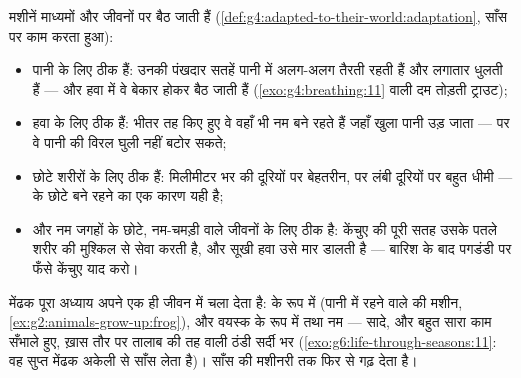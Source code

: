 \begin{proposition}[कौन-सी मशीन कहाँ, और क्यों]\label{prop:g7:how-animals-breathe:fits}
मशीनें माध्यमों और जीवनों पर बैठ जाती हैं
(\cref{def:g4:adapted-to-their-world:adaptation}, साँस पर काम करता
हुआ):
\begin{itemize}
  \item {} पानी के लिए ठीक हैं: उनकी पंखदार सतहें पानी में अलग-अलग
        तैरती रहती हैं और लगातार धुलती हैं --- और हवा में वे बेकार होकर
        बैठ जाती हैं (\cref{exo:g4:breathing:11} वाली दम तोड़ती
        ट्राउट);
  \item {} हवा के लिए ठीक हैं: भीतर तह किए हुए वे वहाँ भी नम बने
        रहते हैं जहाँ खुला पानी उड़ जाता --- पर वे पानी की विरल घुली
         नहीं बटोर सकते;
  \item {} छोटे शरीरों के लिए ठीक हैं: मिलीमीटर भर की दूरियों
        पर बेहतरीन, पर लंबी दूरियों पर बहुत धीमी ---  के छोटे बने
        रहने का एक कारण यही है;
  \item और  नम जगहों के छोटे, नम-चमड़ी वाले जीवनों के लिए
        ठीक है: केंचुए की पूरी सतह उसके पतले शरीर की मुश्किल से सेवा
        करती है, और सूखी हवा उसे मार डालती है --- बारिश के बाद पगडंडी
        पर फँसे केंचुए याद करो।
\end{itemize}
\end{proposition}
\admitted

\begin{example}[एक ही जंतु में दो जीवन, दो मशीनें]\label{ex:g7:how-animals-breathe:frog}
मेंढक पूरा अध्याय अपने एक ही जीवन में चला देता है:  के रूप में
 (पानी में रहने वाले की मशीन,
\cref{ex:g2:animals-grow-up:frog}), और वयस्क के रूप में  तथा नम
 ---  सादे, और  बहुत सारा काम सँभाले हुए, ख़ास तौर पर
तालाब की तह वाली ठंडी सर्दी भर
(\cref{exo:g6:life-through-seasons:11}: वह सुप्त मेंढक अकेली  से
साँस लेता है)।  साँस की मशीनरी तक फिर से गढ़ देता है।
\end{example}

